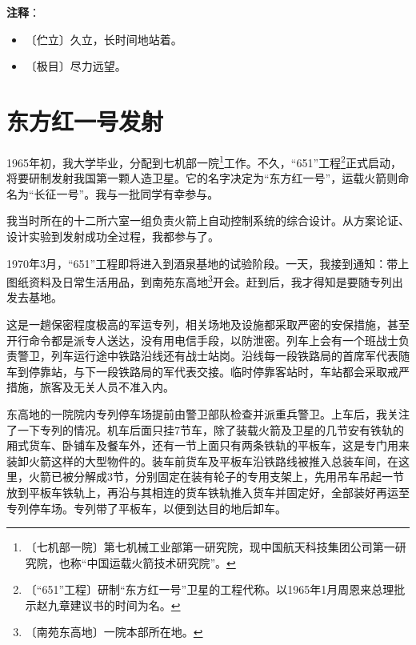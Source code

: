\documentclass[12pt,UTF-8,openany]{ctexbook}
\begin{document}
\newpage

\textbf{注释}：

\vspace{-1em}

\begin{itemize}
    \setlength\itemsep{-0.2em}
    \item 〔伫立〕久立，长时间地站着。
    \item 〔极目〕尽力远望。
\end{itemize}

\chapter{东方红一号发射}

\begin{normalsize}
    
    1965年初，我大学毕业，分配到七机部一院\footnote{〔七机部一院〕第七机械工业部第一研究院，现中国航天科技集团公司第一研究院，也称“中国运载火箭技术研究院”。}工作。不久，“651”工程\footnote{〔“651”工程〕研制“东方红一号”卫星的工程代称。以1965年1月周恩来总理批示赵九章建议书的时间为名。}正式启动，将要研制发射我国第一颗人造卫星。它的名字决定为“东方红一号”，运载火箭则命名为“长征一号”。我与一批同学有幸参与。
    
    我当时所在的十二所六室一组负责火箭上自动控制系统的综合设计。从方案论证、设计实验到发射成功全过程，我都参与了。
    
    1970年3月，“651”工程即将进入到酒泉基地的试验阶段。一天，我接到通知：带上图纸资料及日常生活用品，到南苑东高地\footnote{〔南苑东高地〕一院本部所在地。}开会。赶到后，我才得知是要随专列出发去基地。
    
    这是一趟保密程度极高的军运专列，相关场地及设施都采取严密的安保措施，甚至开行命令都是派专人送达，没有用电信手段，以防泄密。列车上会有一个班战士负责警卫，列车运行途中铁路沿线还有战士站岗。沿线每一段铁路局的首席军代表随车到停靠站，与下一段铁路局的军代表交接。临时停靠客站时，车站都会采取戒严措施，旅客及无关人员不准入内。
    
    东高地的一院院内专列停车场提前由警卫部队检查并派重兵警卫。上车后，我关注了一下专列的情况。机车后面只挂7节车，除了装载火箭及卫星的几节安有铁轨的厢式货车、卧铺车及餐车外，还有一节上面只有两条铁轨的平板车，这是专门用来装卸火箭这样的大型物件的。装车前货车及平板车沿铁路线被推入总装车间，在这里，火箭已被分解成3节，分别固定在装有轮子的专用支架上，先用吊车吊起一节放到平板车铁轨上，再沿与其相连的货车铁轨推入货车并固定好，全部装好再运至专列停车场。专列带了平板车，以便到达目的地后卸车。
    

\end{normalsize}
\end{document}
